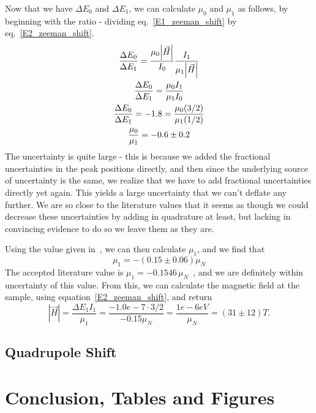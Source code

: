 \documentclass[reprint, nobibnotes, amssymb, amsmath, amsfonts, mathtools, mathrsfs, floatfix]{revtex4-1}
\begin{document}
      Now that we have $\Delta E_0$ and $\Delta E_1$, we can calculate $\mu_0$ and $\mu_1$ as follows, by beginning with the ratio - dividing eq.~\ref{E1_zeeman_shift} by eq.~\ref{E2_zeeman_shift}.
      \begin{gather}
        \frac{\Delta E_0}{\Delta E_1} = \frac{\mu_0 \abs{\vec{H}}}{I_0} \frac{I_1}{\mu_1 \abs{\vec{H}}} \\
        \frac{\Delta E_0}{\Delta E_1} = \frac{\mu_0 I_1}{\mu_1 I_0} \\
        \frac{\Delta E_0}{\Delta E_1} = -1.8 = \frac{\mu_0 (3/2)}{\mu_1 (1/2)} \\
        \frac{\mu_0}{\mu_1} = -0.6 \pm 0.2
      \end{gather}
      The uncertainty is quite large - this is because we added the fractional uncertainties in the peak positions directly, and then since the underlying source of uncertainty is the same, we realize that we have to add fractional uncertainties directly yet again.  This yields a large uncertainty that we can't deflate any further.  We are so close to the literature values that it seems as though we could decrease these uncertainties by adding in quadrature at least, but lacking in convincing evidence to do so we leave them as they are.

      Using the value given in~\cite{lab_manual}, we can then calculate $\mu_1$, and we find that
      \begin{equation}
        \mu_1 = -(0.15\pm0.06)\mu_N
      \end{equation}
      The accepted literature value is $\mu_1 = -0.1546\,\mu_N$~\cite{mu_1}, and we are definitely within uncertainty of this value.  From this, we can calculate the magnetic field at the sample, using equation~\ref{E2_zeeman_shift}, and return
      \begin{equation}
        |\vec{H}| = \frac{\Delta E_1 I_1}{\mu_1} = \frac{-1.0e-7 \cdot 3/2}{-0.15 \mu_N} = \frac{1e-6 eV}{\mu_N} = (31\pm12) T.
      \end{equation}

    \subsection{Quadrupole Shift}




  \section{Conclusion, Tables and Figures}
\end{document}
